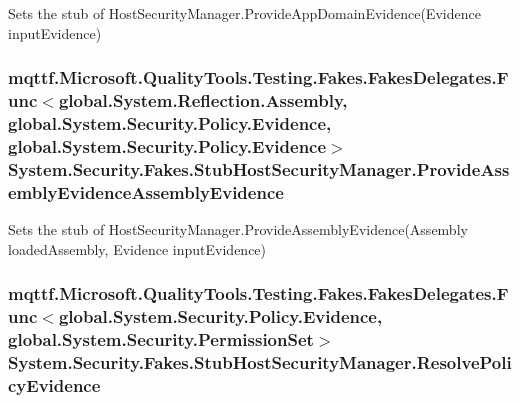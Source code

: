 Sets the stub of Host\-Security\-Manager.\-Provide\-App\-Domain\-Evidence(\-Evidence input\-Evidence)

\hypertarget{class_system_1_1_security_1_1_fakes_1_1_stub_host_security_manager_ad822d1ab22c9646cd47a9d793b9e7ca7}{
\subsubsection[{Provide\-Assembly\-Evidence\-Assembly\-Evidence}]{\setlength{\rightskip}{0pt plus 5cm}mqttf.\-Microsoft.\-Quality\-Tools.\-Testing.\-Fakes.\-Fakes\-Delegates.\-Func$<$global.\-System.\-Reflection.\-Assembly, global.\-System.\-Security.\-Policy.\-Evidence, global.\-System.\-Security.\-Policy.\-Evidence$>$ System.\-Security.\-Fakes.\-Stub\-Host\-Security\-Manager.\-Provide\-Assembly\-Evidence\-Assembly\-Evidence}}\label{class_system_1_1_security_1_1_fakes_1_1_stub_host_security_manager_ad822d1ab22c9646cd47a9d793b9e7ca7}


Sets the stub of Host\-Security\-Manager.\-Provide\-Assembly\-Evidence(\-Assembly loaded\-Assembly, Evidence input\-Evidence)

\hypertarget{class_system_1_1_security_1_1_fakes_1_1_stub_host_security_manager_ac2e86820e6d815a5a87bf78ff6770d59}{
\subsubsection[{Resolve\-Policy\-Evidence}]{\setlength{\rightskip}{0pt plus 5cm}mqttf.\-Microsoft.\-Quality\-Tools.\-Testing.\-Fakes.\-Fakes\-Delegates.\-Func$<$global.\-System.\-Security.\-Policy.\-Evidence, global.\-System.\-Security.\-Permission\-Set$>$ System.\-Security.\-Fakes.\-Stub\-Host\-Security\-Manager.\-Resolve\-Policy\-Evidence}}\label{class_system_1_1_security_1_1_fakes_1_1_stub_host_security_manager_ac2e86820e6d815a5a87bf78ff6770d59}


